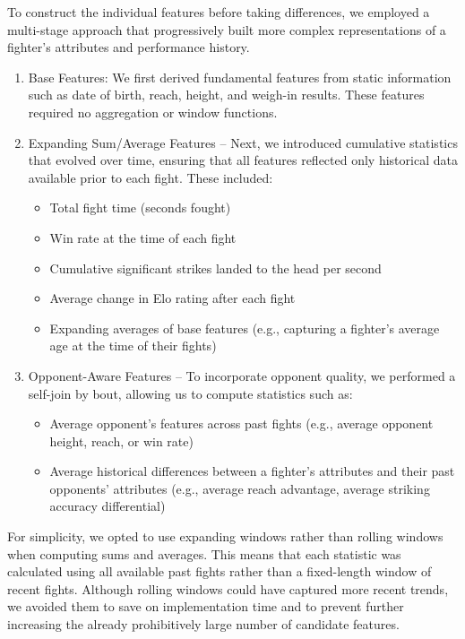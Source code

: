 \documentclass[12pt,twoside]{report}
\begin{document}
To construct the individual features before taking differences, we employed a multi-stage approach that progressively built more complex representations of a fighter's attributes and performance history.
\begin{enumerate}
    \item Base Features: We first derived fundamental features from static information such as date of birth, reach, height, and weigh-in results. These features required no aggregation or window functions.

    \item Expanding Sum/Average Features – Next, we introduced cumulative statistics that evolved over time, ensuring that all features reflected only historical data available prior to each fight. These included:
    \begin{itemize}
        \item Total fight time (seconds fought)

        \item Win rate at the time of each fight

        \item Cumulative significant strikes landed to the head per second

        \item Average change in Elo rating after each fight

        \item Expanding averages of base features (e.g., capturing a fighter’s average age at the time of their fights)
    \end{itemize}

    \item Opponent-Aware Features – To incorporate opponent quality, we performed a self-join by bout, allowing us to compute statistics such as:
    \begin{itemize}
        \item Average opponent’s features across past fights (e.g., average opponent height, reach, or win rate)

        \item Average historical differences between a fighter’s attributes and their past opponents’ attributes (e.g., average reach advantage, average striking accuracy differential)
    \end{itemize}
\end{enumerate}
For simplicity, we opted to use expanding windows rather than rolling windows when computing sums and averages. This means that each statistic was calculated using all available past fights rather than a fixed-length window of recent fights. Although rolling windows could have captured more recent trends, we avoided them to save on implementation time and to prevent further increasing the already prohibitively large number of candidate features.
\end{document}
